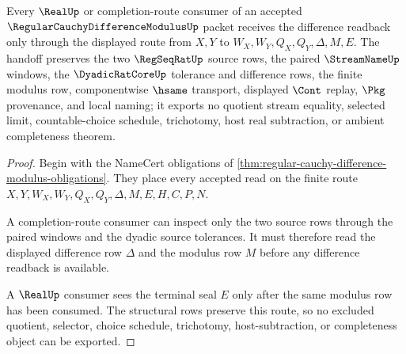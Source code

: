 \begin{theorem}
\label{thm:regular-cauchy-difference-modulus-real-seal-handoff}
Every $\RealUp$ or completion-route consumer of an accepted $\RegularCauchyDifferenceModulusUp$ packet receives the difference readback only through the displayed route from $X,Y$ to $W_X,W_Y,Q_X,Q_Y,\Delta,M,E$. The handoff preserves the two $\RegSeqRatUp$ source rows, the paired $\StreamNameUp$ windows, the $\DyadicRatCoreUp$ tolerance and difference rows, the finite modulus row, componentwise $\hsame$ transport, displayed $\Cont$ replay, $\Pkg$ provenance, and local naming; it exports no quotient stream equality, selected limit, countable-choice schedule, trichotomy, host real subtraction, or ambient completeness theorem.
\end{theorem}
\begin{proof}
Begin with the NameCert obligations of \autoref{thm:regular-cauchy-difference-modulus-obligations}. They place every accepted read on the finite route $X,Y,W_X,W_Y,Q_X,Q_Y,\Delta,M,E,H,C,P,N$.

A completion-route consumer can inspect only the two source rows through the paired windows and the dyadic source tolerances. It must therefore read the displayed difference row $\Delta$ and the modulus row $M$ before any difference readback is available.

A $\RealUp$ consumer sees the terminal seal $E$ only after the same modulus row has been consumed. The structural rows preserve this route, so no excluded quotient, selector, choice schedule, trichotomy, host-subtraction, or completeness object can be exported.
\end{proof}



